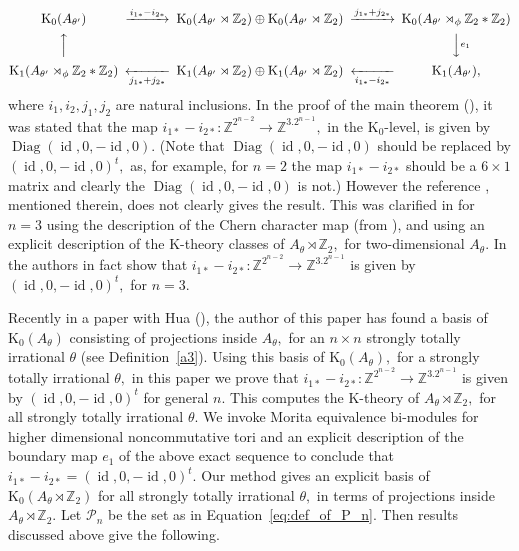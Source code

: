 \documentclass[9pt, BCOR=2mm]{amsart}
\numberwithin{equation}{section}
\numberwithin{equation}{section}
\newcommand{\Z}{{\mathbb{Z}}}
\newcommand{\K}{\mathrm{K}} %
\DeclareMathOperator{\id}{id}
\begin{document}
{\small \[
\begin{CD}
\K_0 (A_{\theta'}) @>{i_{1*}-i_{2*}}>>\K_0 (A_{\theta'}\rtimes  \Z_2)\oplus \K_0 (A_{\theta'}\rtimes \Z_2)@>{j_{1*}+j_{2*}}>> \K_0 (A_{\theta'}\rtimes_\phi \Z_2*\Z_2)   \\
@A{}AA & &  @VV{e_1}V            \\
 \K_1 (A_{\theta'}\rtimes_\phi \Z_2*\Z_2) @<<{j_{1*}+j_{2*}}<  \K_1 (A_{\theta'}\rtimes \Z_2)\oplus \K_1 (A_{\theta'}\rtimes \Z_2) @<<{i_{1*}-i_{2*}}< \K_1 (A_{\theta'}),
\end{CD}
\]} 
\noindent \ignorespacesafterend where $i_1, i_2, j_1,j_2$ are natural inclusions.
In the proof of the main theorem (\cite[Theorem 7]{FW93}), it was stated that the map  $i_{1*}-i_{2*}: \mathbb{Z}^{2^{n-2}} \rightarrow \mathbb{Z}^{3.2^{n-1}},$ in the $\K_0$-level, is given by $\operatorname{Diag}(\id, 0,-\id, 0)$. (Note that $\operatorname{Diag}(\id, 0,-\id, 0)$ should be replaced by $(\id, 0,-\id, 0)^t,$ as, for example, for $n=2$ the map $i_{1*}-i_{2*}$ should be a $6 \times 1$ matrix and clearly the $\operatorname{Diag}(\id, 0,-\id, 0)$ is not.) However the reference \cite[Corollary 7.9]{Rie88}, mentioned therein, does not clearly gives the result.  This was clarified in \cite[Corollary 7.2, (see also Remark 7.5)]{CL19} for $n=3$ using the description of the Chern character map (from \cite{Wal95}), and using an explicit description of the K-theory classes of $A_{\theta}\rtimes \Z_2,$ for two-dimensional $A_{\theta}.$ In \cite[Corollary 7.2]{CL19} the authors in fact show that $i_{1*}-i_{2*}: \mathbb{Z}^{2^{n-2}} \rightarrow \mathbb{Z}^{3.2^{n-1}}$ is given by $(\id, 0,-\id, 0)^t,$ for $n=3$. 


Recently in a paper with Hua (\cite{CH21}), the author of this paper has found a basis of $\K_0(A_\theta)$ consisting of projections inside $A_\theta,$ for an $n \times n$ strongly totally irrational $\theta$ (see Definition~\ref{a3}). Using this basis of $\K_0(A_\theta),$ for a strongly totally irrational $\theta,$ in this paper we prove that $i_{1*}-i_{2*}: \mathbb{Z}^{2^{n-2}} \rightarrow \mathbb{Z}^{3.2^{n-1}}$ is given by $(\id, 0,-\id, 0)^t$ for general $n.$ This computes the K-theory of $A_\theta \rtimes \Z_2,$ for all strongly totally irrational $\theta.$ We invoke Morita equivalence bi-modules for higher dimensional noncommutative tori and an explicit description of the boundary map $e_1$ of the above exact sequence to conclude that $i_{1*}-i_{2*}=(\id, 0,-\id, 0)^t.$ Our method gives an explicit basis of $\K_0(A_\theta \rtimes \Z_2)$ for all strongly totally irrational $\theta,$ in terms of projections inside $A_\theta \rtimes \Z_2.$ Let $\mathcal{P}_n$ be the set as in Equation~\ref{eq:def_of_P_n}. Then results discussed above give the following. 
\end{document}
